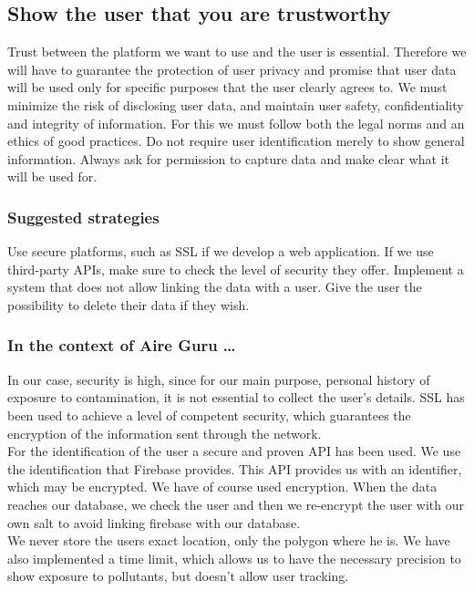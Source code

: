 \subsection{Show the user that you are trustworthy}
Trust between the platform we want to use and the user is essential.
Therefore we will have to guarantee the protection of user privacy and promise that user data will be used only for specific purposes that the user clearly agrees to.
We must minimize the risk of disclosing user data, and maintain user safety, confidentiality and integrity of information.
For this we must follow both the legal norms and an ethics of good practices.
Do not require user identification merely to show general information.
Always ask for permission to capture data and make clear what it will be used for.

\subsubsection*{Suggested strategies} 
Use secure platforms, such as SSL if we develop a web application.
If we use third-party APIs, make sure to check the level of security they offer.
Implement a system that does not allow linking the data with a user.
Give the user the possibility to delete their data if they wish.


\subsubsection*{In the context of Aire Guru \ldots} 
In our case, security is high, since for our main purpose, personal history
of exposure to contamination, it is not essential to collect the user's details.
SSL has been used to achieve a level of competent security, which guarantees the encryption of
the information sent through the network.\\

For the identification of the user a secure and proven API has been used. We use the identification
that Firebase provides. This API provides us with an identifier, which may be encrypted.
We have of course used encryption. When the data reaches our database,
we check the user and then we re-encrypt the user with our own salt to
avoid linking firebase with our database.\\

We never store the users exact location, only the polygon where he is.
We have also implemented a time limit, which allows us to have the necessary precision to show exposure to pollutants, but doesn't allow user tracking.\\

